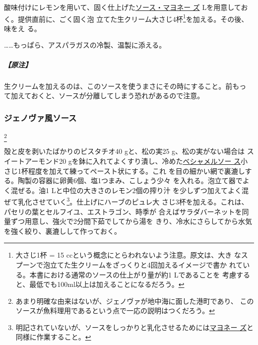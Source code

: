 \begin{recette}
酸味付けにレモンを用いて、固く仕上げた\protect\hyperlink{mayonnaise}{ソース・マヨネー
ズ}\troisquarts{} Lを用意しておく。提供直前に、ごく固く泡
立てた生クリーム大さじ4杯\footnote{大さじ1杯 = 15
  ccという概念にとらわれないよう注意。原文は、大き
  なスプーンで泡立てた生クリームをざっくりと4回加えるイメージで書か
  れている。本書における通常のソースの仕上がり量が約1 Lであることを
  考慮すると、最低でも100ml以上は加えることになるだろう。}を加える。その後、味をえ
る。

\ldots{}\ldots{}もっぱら、アスパラガスの冷製、温製に添える。

\hypertarget{ux539fux6ce8}{%
\subparagraph{【原注】}\label{ux539fux6ce8}}

生クリームを加えるのは、このソースを使うまさにその時にすること。前もっ
て加えておくと、ソースが分離してしまう恐れがあるので注意。

\maeaki

\hypertarget{sauce-genoise-froids}{%
\subsubsection{ジェノヴァ風ソース}\label{sauce-genoise-froids}}

\footnote{あまり明確な由来はないが、ジェノヴァが地中海に面した港町であり、
  このソースが魚料理用であるという点で一応の説明はつくだろう。}


殻と皮を剥いたばかりのピスタチオ40 gと、松の実25 g、松の実がない場合は
スイートアーモンド20
gを鉢に入れてよくすり潰し、冷めた\protect\hyperlink{sauce-bechamel}{ベシャメルソー
ス}小さじ1杯程度を加えて練ってペースト状にする。これ
を目の細かい網で裏漉しする。陶製の容器に卵黄6個、塩1つまみ、こしょう少々
を入れる。泡立て器でよく混ぜる。油1 Lと中位の大きさのレモン2個の搾り汁
を少しずつ加えてよく混ぜて乳化させていく\footnote{明記されていないが、ソースをしっかりと乳化させるためには\protect\hyperlink{mayonnaise}{マヨネー
  ズ}と同様に作業すること。}。仕上げにハーブのピュレ大
さじ3杯を加える。これは、パセリの葉とセルフイユ、エストラゴン、時季が
合えばサラダバーネットを同量ずつ用意し、強火で2分間下茹でしてから湯を
きり、冷水にさらしてから水気を強く絞り、裏漉しして作っておく。


\end{recette}

